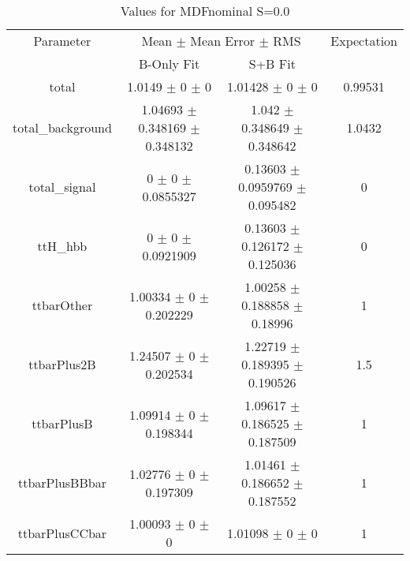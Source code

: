 \begin{table}
\centering
\caption{Values for MDFnominal S=0.0}
\begin{tabular}{cccc}
\toprule
Parameter & \multicolumn{2}{c}{Mean $\pm$ Mean Error $\pm$ RMS} & Expectation\\
 & B-Only Fit & S+B Fit & \\
\midrule
total & \num{1.0149} $\pm$ \num{0} $\pm$ \num{0} & \num{1.01428} $\pm$ \num{0} $\pm$ \num{0} & \num{0.99531}\\
total\_background & \num{1.04693} $\pm$ \num{0.348169} $\pm$ \num{0.348132} & \num{1.042} $\pm$ \num{0.348649} $\pm$ \num{0.348642} & \num{1.0432}\\
total\_signal & \num{0} $\pm$ \num{0} $\pm$ \num{0.0855327} & \num{0.13603} $\pm$ \num{0.0959769} $\pm$ \num{0.095482} & \num{0}\\
ttH\_hbb & \num{0} $\pm$ \num{0} $\pm$ \num{0.0921909} & \num{0.13603} $\pm$ \num{0.126172} $\pm$ \num{0.125036} & \num{0}\\
ttbarOther & \num{1.00334} $\pm$ \num{0} $\pm$ \num{0.202229} & \num{1.00258} $\pm$ \num{0.188858} $\pm$ \num{0.18996} & \num{1}\\
ttbarPlus2B & \num{1.24507} $\pm$ \num{0} $\pm$ \num{0.202534} & \num{1.22719} $\pm$ \num{0.189395} $\pm$ \num{0.190526} & \num{1.5}\\
ttbarPlusB & \num{1.09914} $\pm$ \num{0} $\pm$ \num{0.198344} & \num{1.09617} $\pm$ \num{0.186525} $\pm$ \num{0.187509} & \num{1}\\
ttbarPlusBBbar & \num{1.02776} $\pm$ \num{0} $\pm$ \num{0.197309} & \num{1.01461} $\pm$ \num{0.186652} $\pm$ \num{0.187552} & \num{1}\\
ttbarPlusCCbar & \num{1.00093} $\pm$ \num{0} $\pm$ \num{0} & \num{1.01098} $\pm$ \num{0} $\pm$ \num{0} & \num{1}\\
\bottomrule
\end{tabular}
\end{table}